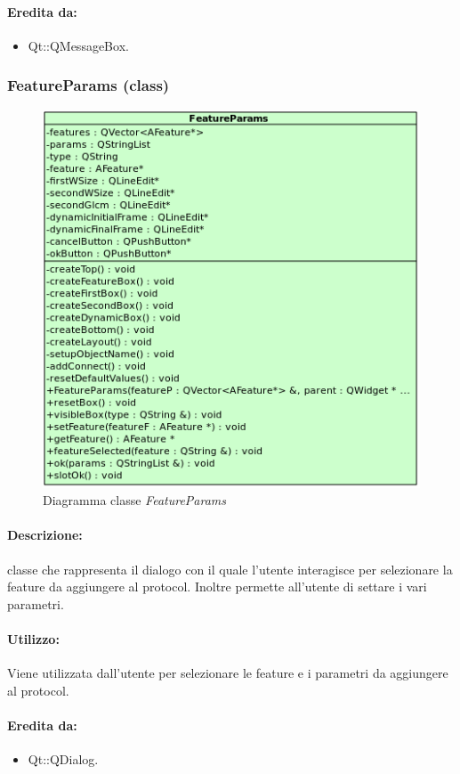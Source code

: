 	\paragraph{Eredita da:}
		\begin{itemize}
			\item Qt::QMessageBox.
		\end{itemize}
	\subsubsection{FeatureParams (class)}
	\begin{figure}[!h]
		\centering
		\includegraphics[scale=2.75]{./Content/Immagini/view/FeatureParams}
		\caption{Diagramma classe \textsl{FeatureParams}}
	\end{figure}
	\paragraph{Descrizione:} classe che rappresenta il dialogo con il quale l’utente interagisce per selezionare la feature\g{} da aggiungere al protocol\g{}.
Inoltre permette all’utente di settare i vari parametri.
	\paragraph{Utilizzo:} Viene utilizzata dall'utente per selezionare le feature\g{} e i parametri da aggiungere al protocol\g{}.
	\paragraph{Eredita da:}
		\begin{itemize}
			\item Qt::QDialog.
		\end{itemize}
